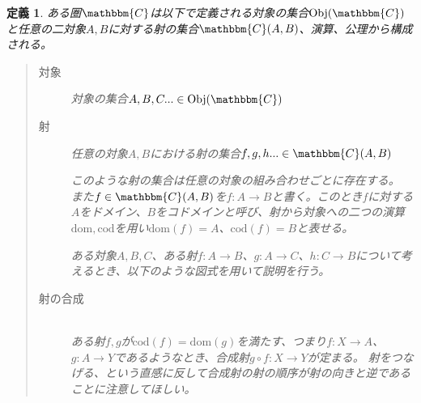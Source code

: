 \documentclass[dvipdfmx]{jsarticle}
\newcommand{\cat}[1]{\mathbbm{#1}}
\newcommand{\arrow}{\rightarrow}
\newcommand{\obj}[1]{\mathrm{Obj}(\cat{#1})}
\newcommand{\mor}[3]{#1:#2\arrow #3}
\newcommand{\dom}{\mathrm{dom}}
\newcommand{\cod}{\mathrm{cod}}
\newcommand{\arset}[3]{\cat{#1}(#2,#3)}
\newtheorem{define}{定義}[section]
\numberwithin{proof}{subsection}
\numberwithin{prop}{subsection}
\numberwithin{define}{subsection}
\begin{document}
	\begin{define}
		ある圏$\cat{C}$は以下で定義される対象の集合$\obj{C}$と任意の二対象$A,B$に対する射の集合$\arset{C}{A}{B}$、演算、公理から構成される。
		\begin{quote}
			\begin{description}
			\item[対象] 対象の集合$A,B,C...\in\obj{C}$
			\item[射] 任意の対象$A,B$における射の集合$f,g,h...\in\arset{C}{A}{B}$

			このような射の集合は任意の対象の組み合わせごとに存在する。
			また$f\in\arset{C}{A}{B}$を$\mor{f}{A}{B}$と書く。このとき$f$に対する$A$をドメイン、$B$をコドメインと呼び、射から対象への二つの演算$\dom,\cod$を用い$\dom(f)=A$、$\cod(f)=B$と表せる。

			ある対象$A,B,C$、ある射$\mor{f}{A}{B}$、$\mor{g}{A}{C}$、$\mor{h}{C}{B}$について考えるとき、以下のような図式を用いて説明を行う。
			\begin{center}
			\end{center}

			\item[射の合成]~\\ ある射$f,g$が$\cod(f)=\dom(g)$を満たす、つまり$\mor{f}{X}{A}$、$\mor{g}{A}{Y}$であるようなとき、合成射$\mor{g\circ f}{X}{Y}$が定まる。
			射をつなげる、という直感に反して合成射の射の順序が射の向きと逆であることに注意してほしい。


\end{description}
\end{quote}
\end{define}
\end{document}
